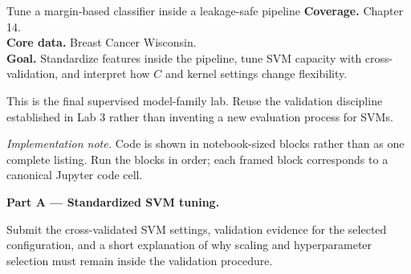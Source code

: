 
\begin{labproject}{Tune a margin-based classifier inside a leakage-safe pipeline}
\textbf{Coverage.} Chapter 14.\\
\textbf{Core data.} Breast Cancer Wisconsin.\\
\textbf{Goal.} Standardize features inside the pipeline, tune SVM capacity with cross-validation, and interpret how $C$ and kernel settings change flexibility.

\begin{labmode}
This is the final supervised model-family lab. Reuse the validation discipline established in Lab 3 rather than inventing a new evaluation process for SVMs.
\end{labmode}

\smallskip\noindent\textit{Implementation note.} Code is shown in notebook-sized blocks rather than as one complete listing. Run the blocks in order; each framed block corresponds to a canonical Jupyter code cell.\par

\medskip\noindent\textbf{Part A --- Standardized SVM tuning.}\par




\end{labproject}

\begin{labdeliverable}
Submit the cross-validated SVM settings, validation evidence for the selected configuration, and a short explanation of why scaling and hyperparameter selection must remain inside the validation procedure.
\end{labdeliverable}

